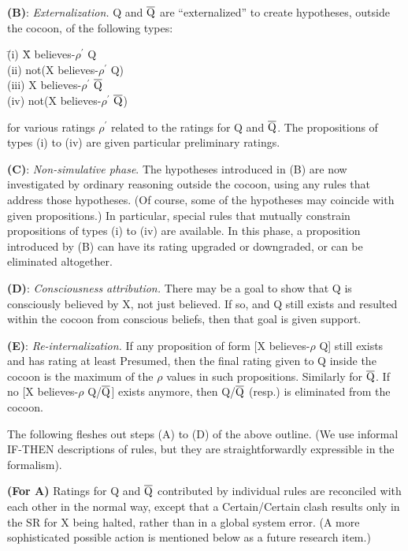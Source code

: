 {\bf (B)}: {\it Externalization.} Q and $\overline{{\rm Q}}$ are ``externalized'' to
create hypotheses, outside the cocoon, of the following types:

\begin{tabbing}
\quad \=(i) \quad \= X believes-$\rho^\prime$ Q\\
      \>(ii)      \> not(X believes-$\rho^\prime$ Q)\\
      \>(iii)     \> X believes-$\rho^\prime$ $\overline{{\rm Q}}$\\
      \>(iv)      \> not(X believes-$\rho^\prime$ $\overline{{\rm Q}}$)
\end{tabbing}

for various ratings $\rho^\prime$ related to the ratings for Q and $\overline{{\rm Q}}$.
The propositions of types (i) to (iv) are given particular preliminary ratings.

{\bf (C)}: {\it Non-simulative phase}. The hypotheses introduced in (B) are now
investigated by ordinary reasoning outside the cocoon, using any rules that
address those hypotheses. (Of course, some of the hypotheses may coincide with
given propositions.) In particular, special rules that mutually constrain
propositions of types (i) to (iv) are available.  In this phase, a proposition
introduced by (B) can have its rating upgraded or downgraded, or can be
eliminated altogether.

{\bf (D)}: {\it Consciousness attribution.} There may be a goal to show that Q
is consciously believed by X, not just believed.  If so, and Q still exists and
resulted within the cocoon from conscious beliefs, then that goal is given
support.  


{\bf (E)}: {\it Re-internalization.} If any proposition of form [X believes-$\rho$ Q]
still exists and has rating at least Presumed, then the final rating given to Q
inside the cocoon is the maximum of the $\rho$ values in such propositions.
Similarly for $\overline{{\rm Q}}$. If no [X believes-$\rho$ Q/$\overline{{\rm
Q}}$] exists anymore, then Q/$\overline{{\rm Q}}$ (resp.) is eliminated from
the cocoon.


The following fleshes out steps (A) to (D) of the above outline.  (We use
informal IF-THEN descriptions of rules, but they are straightforwardly
expressible in the formalism).

{\bf (For A)} Ratings for Q and $\overline{{\rm Q}}$ contributed by individual rules are
reconciled with each other in the normal way, except that a Certain/Certain
clash results only in the SR for X being halted, rather than in a global system
error.  (A more sophisticated possible action is mentioned below as a future
research item.)


